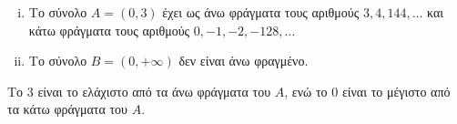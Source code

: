 \documentclass[main.tex]{subfiles}
\begin{document}
\begin{example}
\item {}
    \begin{enumerate}[i)]
        \item Το  σύνολο $ A = (0,3) $  έχει ως άνω φράγματα τους αριθμούς 
            $ 3, 4, 144, \ldots$ και κάτω φράγματα τους αριθμούς
            $ 0, -1, -2, -128, \ldots $ 

        \item Το σύνολο $ B = (0,+\infty) $ δεν είναι άνω φραγμένο.
    \end{enumerate}
\end{example}

\begin{rem}
    Το  $ 3 $ είναι το ελάχιστο από τα άνω φράγματα του $A$, ενώ το $ 0
    $ είναι το μέγιστο από τα κάτω φράγματα του $A$. 
\end{rem}



\end{document}

